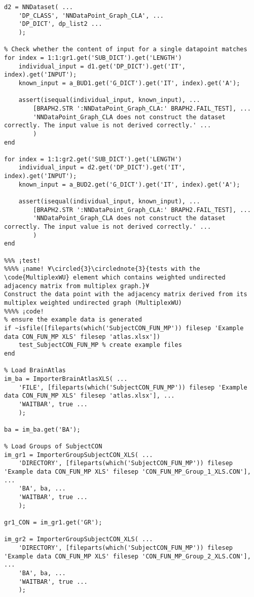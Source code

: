 \documentclass{tufte-handout}
\begin{document}
\begin{lstlisting}
d2 = NNDataset( ...
    'DP_CLASS', 'NNDataPoint_Graph_CLA', ...
    'DP_DICT', dp_list2 ...
    );

% Check whether the content of input for a single datapoint matches
for index = 1:1:gr1.get('SUB_DICT').get('LENGTH')
    individual_input = d1.get('DP_DICT').get('IT', index).get('INPUT');
    known_input = a_BUD1.get('G_DICT').get('IT', index).get('A');

    assert(isequal(individual_input, known_input), ...
        [BRAPH2.STR ':NNDataPoint_Graph_CLA:' BRAPH2.FAIL_TEST], ...
        'NNDataPoint_Graph_CLA does not construct the dataset correctly. The input value is not derived correctly.' ...
        )
end

for index = 1:1:gr2.get('SUB_DICT').get('LENGTH')
    individual_input = d2.get('DP_DICT').get('IT', index).get('INPUT');
    known_input = a_BUD2.get('G_DICT').get('IT', index).get('A');

    assert(isequal(individual_input, known_input), ...
        [BRAPH2.STR ':NNDataPoint_Graph_CLA:' BRAPH2.FAIL_TEST], ...
        'NNDataPoint_Graph_CLA does not construct the dataset correctly. The input value is not derived correctly.' ...
        )
end

%%% ¡test!
%%%% ¡name! ¥\circled{3}\circlednote{3}{tests with the \code{MultiplexWU} element which contains weighted undirected adjacency matrix from multiplex graph.}¥
Construct the data point with the adjacency matrix derived from its multiplex weighted undirected graph (MultiplexWU) 
%%%% ¡code!
% ensure the example data is generated
if ~isfile([fileparts(which('SubjectCON_FUN_MP')) filesep 'Example data CON_FUN_MP XLS' filesep 'atlas.xlsx'])
    test_SubjectCON_FUN_MP % create example files
end

% Load BrainAtlas
im_ba = ImporterBrainAtlasXLS( ...
    'FILE', [fileparts(which('SubjectCON_FUN_MP')) filesep 'Example data CON_FUN_MP XLS' filesep 'atlas.xlsx'], ...
    'WAITBAR', true ...
    );

ba = im_ba.get('BA');

% Load Groups of SubjectCON
im_gr1 = ImporterGroupSubjectCON_XLS( ...
    'DIRECTORY', [fileparts(which('SubjectCON_FUN_MP')) filesep 'Example data CON_FUN_MP XLS' filesep 'CON_FUN_MP_Group_1_XLS.CON'], ...
    'BA', ba, ...
    'WAITBAR', true ...
    );

gr1_CON = im_gr1.get('GR');

im_gr2 = ImporterGroupSubjectCON_XLS( ...
    'DIRECTORY', [fileparts(which('SubjectCON_FUN_MP')) filesep 'Example data CON_FUN_MP XLS' filesep 'CON_FUN_MP_Group_2_XLS.CON'], ...
    'BA', ba, ...
    'WAITBAR', true ...
    );


\end{lstlisting}
\end{document}
